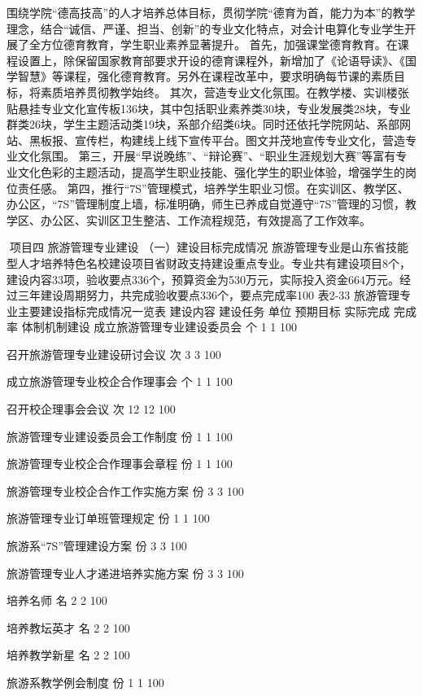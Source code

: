 围绕学院“德高技高”的人才培养总体目标，贯彻学院“德育为首，能力为本”的教学理念，结合“诚信、严谨、担当、创新”的专业文化特点，对会计电算化专业学生开展了全方位德育教育，学生职业素养显著提升。
首先，加强课堂德育教育。在课程设置上，除保留国家教育部要求开设的德育课程外，新增加了《论语导读》、《国学智慧》等课程，强化德育教育。另外在课程改革中，要求明确每节课的素质目标，将素质培养贯彻教学始终。
其次，营造专业文化氛围。在教学楼、实训楼张贴悬挂专业文化宣传板136块，其中包括职业素养类30块，专业发展类28块，专业群类26块，学生主题活动类19块，系部介绍类6块。同时还依托学院网站、系部网站、黑板报、宣传栏，构建线上线下宣传平台。图文并茂地宣传专业文化，营造专业文化氛围。
第三，开展“早说晚练”、“辩论赛”、“职业生涯规划大赛”等富有专业文化色彩的主题活动，提高学生职业技能、强化学生的职业体验，增强学生的岗位责任感。
第四，推行“7S”管理模式，培养学生职业习惯。在实训区、教学区、办公区，“7S”管理制度上墙，标准明确，师生已养成自觉遵守“7S”管理的习惯，教学区、办公区、实训区卫生整洁、工作流程规范，有效提高了工作效率。








项目四   旅游管理专业建设
（一）建设目标完成情况
旅游管理专业是山东省技能型人才培养特色名校建设项目省财政支持建设重点专业。专业共有建设项目8个，建设内容33项，验收要点336个，预算资金为530万元，实际投入资金664万元。经过三年建设周期努力，共完成验收要点336个，要点完成率100%
表2-33  旅游管理专业主要建设指标完成情况一览表
建设内容
建设任务
单位
预期目标
实际完成
完成率
体制机制建设
成立旅游管理专业建设委员会
个
1
1
100%

召开旅游管理专业建设研讨会议
次
3
3
100%

成立旅游管理专业校企合作理事会
个
1
1
100%

召开校企理事会会议
次
12
12
100%

旅游管理专业建设委员会工作制度
份
1
1
100%

旅游管理专业校企合作理事会章程
份
1
1
100%

旅游管理专业校企合作工作实施方案
份
3
3
100%

旅游管理专业订单班管理规定
份
1
1
100%

旅游系“7S”管理建设方案
份
3
3
100%

旅游管理专业人才递进培养实施方案
份
3
3
100%

培养名师
名
2
2
100%

培养教坛英才
名
2
2
100%

培养教学新星
名
2
2
100%

旅游系教学例会制度
份
1
1
100%

